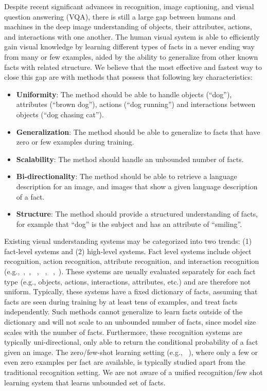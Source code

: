 \documentclass[runningheads]{llncs}
\begin{document}
Despite recent significant advances in recognition, image captioning, and visual question answering (VQA), there is still a large gap between humans and machines in the deep image understanding of objects, their attributes, actions, and interactions with one another. The human visual system is able to efficiently gain visual knowledge by learning different types of facts in a never ending way from many or few examples, aided by the ability to generalize from other known facts with related structure. We believe that the most effective and fastest way to close this gap are with methods that possess that following key characteristics:
\begin{itemize}
	\item \textbf{Uniformity}:  The method should be able to handle objects (``dog''), attributes (``brown dog''), actions (``dog running'') and interactions between objects (``dog chasing cat'').
	\item \textbf{Generalization}:  The method should be able to generalize to facts
that have zero or few examples during training.
	\item \textbf{Scalability}:  The method should handle an unbounded number of facts.
	\item \textbf{Bi-directionality}:  The method should be able to retrieve a language description for an image, and images that show a given language description of a fact.
	\item \textbf{Structure}:  The method should provide a structured understanding of facts, for example that ``dog'' is the subject and has an attribute of ``smiling''. %
\end{itemize}%


Existing visual understanding systems may be categorized into two trends: (1)  fact-level systems and (2) high-level systems. Fact level  systems include object recognition, action recognition, attribute recognition, and interaction recognition  (e.g.,~\cite{simonyan2014very},~\cite{zhang2014panda}, ~\cite{chen2014inferring}, ~\cite{zhou2014learning}, ~\cite{gkioxari2014finding},~\cite{Antol2014}). These systems are usually evaluated
separately for each fact type (e.g., objects, actions, interactions, attributes, etc.) and are therefore not uniform.
Typically, these systems have a fixed dictionary of facts, assuming that facts are seen during training by at least tens of examples, and treat facts independently. Such methods cannot generalize to learn facts outside of the dictionary and will not scale to an unbounded number of facts, since model size scales with the number of facts.
Furthermore, these recognition systems are typically uni-directional, only able to return the conditional probability of a fact given an image.
The zero/few-shot learning setting (e.g., ~\cite{romera2015embarrassingly,lampert2009learning}),  where only a few or even zero examples per fact are available, is typically studied apart from the traditional recognition setting.
We are not aware of a unified recognition/few shot learning system that learns unbounded set of facts.
\end{document}
